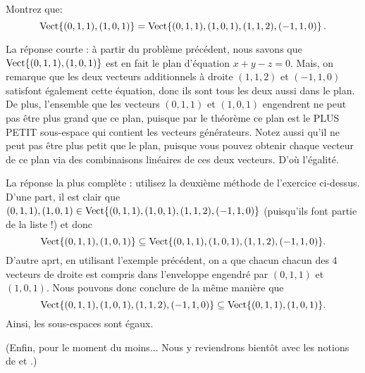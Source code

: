 
\begin{myprob} Montrez que: $$\textrm{Vect}\{(0,1,1),(1,0,1)\} = \textrm{Vect}\{(0,1,1),(1,0,1),(1,1,2),(-1,1,0)\}\,.$$

\begin{mysol} La réponse courte : à partir du problème précédent, nous savons que $\textrm{Vect}\{(0,1,1),(1,0,1)\}$ est en fait le plan d'équation $x+y-z=0$.
Mais, on remarque que les deux vecteurs additionnels à droite $(1,1,2)$ et $(-1,1,0)$ satisfont également cette équation, donc ils sont tous les deux aussi dans le plan. De plus, l'ensemble que les vecteurs $(0,1,1)$ et $(1,0,1)$ engendrent ne peut pas être plus grand que ce plan, puisque par le théorème ce plan est le PLUS PETIT
sous-espace qui contient les vecteurs générateurs.  Notez aussi qu'il ne peut pas être
plus petit que le plan, puisque vous pouvez obtenir chaque vecteur
de ce plan via des combinaisons linéaires de ces deux vecteurs. D'où l'égalité.

La réponse la plus complète : utilisez la deuxième méthode de l'exercice ci-dessus. D'une part, il est clair que
$(0,1,1), (1,0,1) \in \textrm{Vect}\{(0,1,1),(1,0,1),(1,1,2),(-1,1,0)\}$
(puisqu'ils font partie de la liste !) et donc
$$
\textrm{Vect}\{(0,1,1),(1,0,1)\} \subseteq \textrm{Vect}\{(0,1,1),(1,0,1),(1,1,2),(-1,1,0)\}.
$$
D'autre aprt, en utilisant l'exemple précédent, on a que chacun
chacun des 4 vecteurs de droite est compris dans l'enveloppe engendré par
$(0,1,1)$ et $(1,0,1)$. Nous pouvons donc conclure de la même manière que
$$
\textrm{Vect}\{(0,1,1),(1,0,1),(1,1,2),(-1,1,0)\} \subseteq \textrm{Vect}\{(0,1,1),(1,0,1)\}.
$$
Ainsi, les sous-espaces sont égaux. \end{mysol}\end{myprob}


(Enfin, pour le moment du moins... Nous y reviendrons bientôt avec les notions de  et .)





